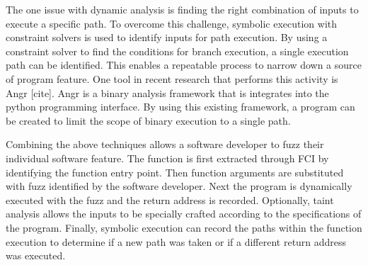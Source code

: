 \documentclass[conference]{IEEEtran}
\begin{document}
The one issue with dynamic analysis is finding the right combination of inputs to execute a specific path. To overcome this challenge, symbolic execution with constraint solvers is used to identify inputs for path execution. By using a constraint solver to find the conditions for branch execution, a single execution path can be identified. This enables a repeatable process to narrow down a source of program feature. One tool in recent research that performs this activity is Angr [cite]. Angr is a binary analysis framework that is integrates into the python programming interface. By using this existing framework, a program can be created to limit the scope of binary execution to a single path.

Combining the above techniques allows a software developer to fuzz their individual software feature. The function is first extracted through FCI by identifying the function entry point. Then function arguments are substituted with fuzz identified by the software developer. Next the program is dynamically executed with the fuzz and the return address is recorded. Optionally, taint analysis allows the inputs to be specially crafted according to the specifications of the program. Finally, symbolic execution can record the paths within the function execution to determine if a new path was taken or if a different return address was executed. 
\end{document}
